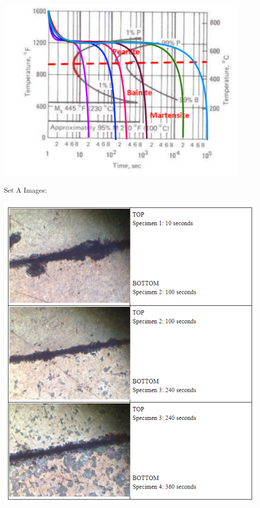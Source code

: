 \documentclass{article}
\begin{document}
\begin{center}
\includegraphics[width=350pt]{4.png}
\end{center}

\newpage 
Set A Images:
\begin{center}
\includegraphics[width=400pt]{5.png}
\end{center}
\end{document}
